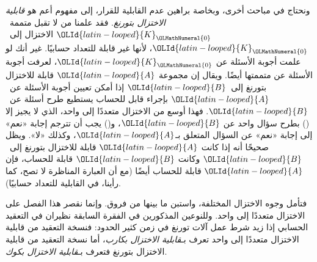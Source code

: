 \documentclass[../../../include/open-logic-section]{subfiles}
\begin{document}
\begin{digress}
ونحتاج في مباحث أخرى، وبخاصة براهين عدم القابلية للقرار، إلى مفهوم
أعم هو \emph{قابلية الاختزال بتورنغ}. فقد علمنا من
 لا تقبل متممة~${\OLId{latin-looped}{K}}_{\OLMathNumeral{0}}$ الاختزال إلى~${\OLId{latin-looped}{K}}_{\OLMathNumeral{0}}$، لأنها
غير قابلة للتعداد حسابيًا. غير أنك لو علمت أجوبة الأسئلة عن
${\OLId{latin-looped}{K}}_{\OLMathNumeral{0}}$، لعرفت أجوبة الأسئلة عن متممتها أيضًا. ويقال إن مجموعة ${\OLId{latin-looped}{A}}$
قابلة للاختزال بتورنغ إلى~${\OLId{latin-looped}{B}}$ إذا أمكن تعيين أجوبة الأسئلة عن~${\OLId{latin-looped}{A}}$
بإجراء قابل للحساب يستطيع طرح أسئلة عن~${\OLId{latin-looped}{B}}$. فهذا أوسع من
الاختزال متعددًا إلى واحد، الذي لا يجيز إلا () بطرح سؤال
واحد عن ${\OLId{latin-looped}{B}}$، و() يجب أن تترجم إجابة «نعم» إلى إجابة «نعم» عن السؤال
المتعلق بـ${\OLId{latin-looped}{A}}$، وكذلك «لا». ويظل صحيحًا أنه إذا كانت ${\OLId{latin-looped}{A}}$ قابلة للاختزال
بتورنغ إلى~${\OLId{latin-looped}{B}}$ وكانت ${\OLId{latin-looped}{B}}$ قابلة للحساب، فإن ${\OLId{latin-looped}{A}}$ قابلة للحساب أيضًا
(مع أن العبارة المناظرة لا تصح، كما رأينا، في القابلية للتعداد حسابيًا).

فتأمل وجوه الاختزال المختلفة، واستبن ما بينها من
فروق. وإنما نقصر هذا الفصل على الاختزال
متعددًا إلى واحد. وللنوعين المذكورين في الفقرة
السابقة نظيران في التعقيد الحسابي إذا زيد شرط عمل
آلات تورنغ في زمن كثير الحدود: فنسخة التعقيد من قابلية الاختزال متعددًا
إلى واحد تعرف بـ\emph{قابلية الاختزال بكارب}، أما نسخة التعقيد من
قابلية الاختزال بتورنغ فتعرف بـ\emph{قابلية الاختزال بكوك}.
\end{digress}
\end{document}
